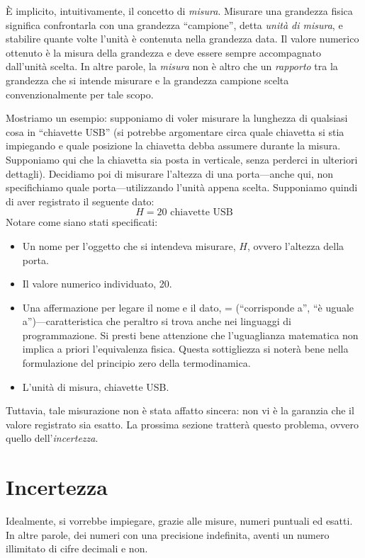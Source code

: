 \noindent È implicito, intuitivamente, il concetto di \textit{misura}. Misurare una grandezza
fisica significa confrontarla con una grandezza ``campione'', detta \textit{unità
di misura}, e stabilire quante volte l'unità è contenuta nella
grandezza data. Il valore numerico ottenuto è la misura della grandezza e deve
essere sempre accompagnato dall'unità scelta.
In altre parole, la \textit{misura} non è altro che un \textit{rapporto} tra la
grandezza che si intende misurare e la grandezza campione scelta convenzionalmente
per tale scopo.

Mostriamo un esempio: supponiamo di voler misurare la lunghezza di qualsiasi cosa
in ``chiavette USB'' (si potrebbe argomentare circa quale chiavetta si stia
impiegando e quale posizione la chiavetta debba assumere durante la misura.
Supponiamo qui che la chiavetta sia posta in verticale, senza perderci in ulteriori
dettagli). Decidiamo poi di misurare l'altezza di una porta—anche qui, non
specifichiamo quale porta—utilizzando l'unità appena scelta. Supponiamo quindi
di aver registrato il seguente dato:
\[ H = 20 \text{ chiavette USB} \]
Notare come siano stati specificati:
\begin{itemize}
    \item Un nome per l'oggetto che si intendeva misurare, $H$, ovvero l'altezza
    della porta.
    \item Il valore numerico individuato, 20.
    \item Una affermazione per legare il nome e il dato, = (``corrisponde a'', ``è
    uguale a'')—caratteristica che peraltro si trova anche nei linguaggi di
    programmazione. Si presti bene attenzione che l'uguaglianza matematica
    non implica a priori l'equivalenza fisica. Questa sottigliezza si
    noterà bene nella formulazione del principio zero della termodinamica.
    \item L'unità di misura, chiavette USB.
\end{itemize}
Tuttavia, tale misurazione non è stata affatto sincera: non vi è la
garanzia che il valore registrato sia esatto. La prossima sezione
tratterà questo problema, ovvero quello dell'\textit{incertezza}.


\section{Incertezza}
Idealmente, si vorrebbe impiegare, grazie alle misure, numeri puntuali ed esatti.
In altre parole, dei numeri con una precisione indefinita, aventi un numero
illimitato di cifre decimali e non.

